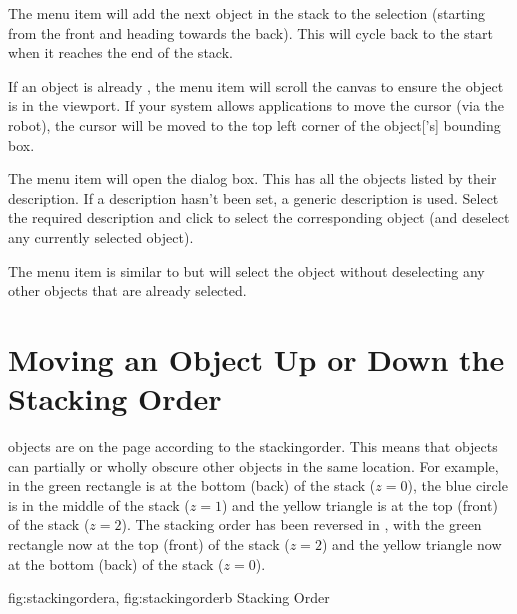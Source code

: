 
The  menu item will add
the next \gls{object} in the \gls{stack} to the selection (starting from
the \gls{front} and heading towards the \gls{back}). This will cycle back to
the start when it reaches the end of the stack.


If an \gls{object} is already \selected, the 
menu item will scroll the \gls{canvas} to ensure the \gls{object} is
in the viewport. If your system allows applications to move the
cursor (via the \gls{robot}), the cursor will be moved to the top left corner of the
\gls{object}['s] bounding box.


The  menu item will open the
 dialog box. This has all the \glspl{object}
listed by their description.  If a description hasn't been set, a
generic description is used.  Select the required description and
click  to select the corresponding \gls{object} (and
deselect any currently selected \gls{object}).


The  menu item is similar to 
 but will select the \gls{object}
without deselecting any other \glspl{object} that are already
selected.

\section{Moving an Object Up or Down the Stacking Order}\label{sec:moveupordown}

\Glspl{object} are  on the page according to the
\gls{stackingorder}. This means that objects can
partially or wholly obscure other objects in the same location.
For example, in  the green rectangle is
at the bottom (\gls{back}) of the stack ($z=0$), the blue circle is in
the middle of the stack ($z=1$) and the yellow triangle is at the
top (\gls{front}) of the stack ($z=2$). The stacking order has
been reversed in , with the green
rectangle now at the top (front) of the stack ($z=2$) and
the yellow triangle now at the bottom (back) of the stack
($z=0$).

{
  {fig:stackingordera}{}{},
  {fig:stackingorderb}{}{}
}
{Stacking Order}

